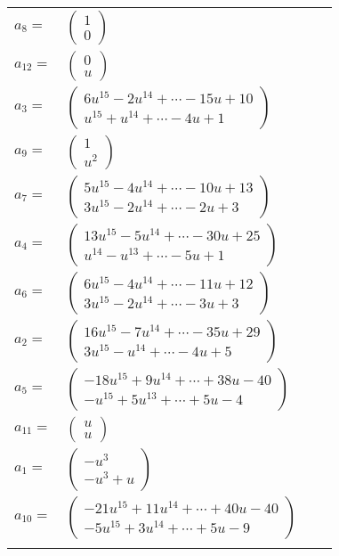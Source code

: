\documentclass[1p]{elsarticle_modified}
\theoremstyle{definition}
\begin{document}
\begin{tabular}{m{7pt} m{180pt} m{7pt} m{180pt} }
\flushright $a_{8}=$&$\begin{pmatrix}1\\0\end{pmatrix}$ \\
\flushright $a_{12}=$&$\begin{pmatrix}0\\u\end{pmatrix}$ \\
\flushright $a_{3}=$&$\begin{pmatrix}6 u^{15}-2 u^{14}+\cdots-15 u+10\\u^{15}+u^{14}+\cdots-4 u+1\end{pmatrix}$ \\
\flushright $a_{9}=$&$\begin{pmatrix}1\\u^2\end{pmatrix}$ \\
\flushright $a_{7}=$&$\begin{pmatrix}5 u^{15}-4 u^{14}+\cdots-10 u+13\\3 u^{15}-2 u^{14}+\cdots-2 u+3\end{pmatrix}$ \\
\flushright $a_{4}=$&$\begin{pmatrix}13 u^{15}-5 u^{14}+\cdots-30 u+25\\u^{14}- u^{13}+\cdots-5 u+1\end{pmatrix}$ \\
\flushright $a_{6}=$&$\begin{pmatrix}6 u^{15}-4 u^{14}+\cdots-11 u+12\\3 u^{15}-2 u^{14}+\cdots-3 u+3\end{pmatrix}$ \\
\flushright $a_{2}=$&$\begin{pmatrix}16 u^{15}-7 u^{14}+\cdots-35 u+29\\3 u^{15}- u^{14}+\cdots-4 u+5\end{pmatrix}$ \\
\flushright $a_{5}=$&$\begin{pmatrix}-18 u^{15}+9 u^{14}+\cdots+38 u-40\\- u^{15}+5 u^{13}+\cdots+5 u-4\end{pmatrix}$ \\
\flushright $a_{11}=$&$\begin{pmatrix}u\\u\end{pmatrix}$ \\
\flushright $a_{1}=$&$\begin{pmatrix}- u^3\\- u^3+u\end{pmatrix}$ \\
\flushright $a_{10}=$&$\begin{pmatrix}-21 u^{15}+11 u^{14}+\cdots+40 u-40\\-5 u^{15}+3 u^{14}+\cdots+5 u-9\end{pmatrix}$\\&\end{tabular}
\end{document}
